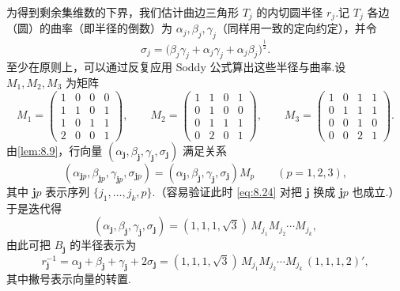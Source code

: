 为得到剩余集维数的下界，我们估计曲边三角形 $T_j$ 的内切圆半径 $r_j$.记 $T_j$ 各边（圆）的曲率（即半径的倒数）为 $\alpha_j,\beta_j,\gamma_j$（同样用一致的定向约定），并令
\begin{equation}\label{eq:8.24}
  \sigma_j=\bigl(\beta_j\gamma_j+\alpha_j\gamma_j+\alpha_j\beta_j\bigr)^{\frac{1}{2}}.
\end{equation}
至少在原则上，可以通过反复应用 Soddy 公式算出这些半径与曲率.设 $M_1,M_2,M_3$ 为矩阵
\[
  M_1=\begin{pmatrix}1&0&0&0\\1&1&0&1\\1&0&1&1\\2&0&0&1\end{pmatrix},\qquad
  M_2=\begin{pmatrix}1&1&0&1\\0&1&0&0\\0&1&1&1\\0&2&0&1\end{pmatrix},\qquad
  M_3=\begin{pmatrix}1&0&1&1\\0&1&1&1\\0&0&1&0\\0&0&2&1\end{pmatrix}.
\]
由\cref{lem:8.9}，行向量 $(\alpha_{\mathbf{j}},\beta_{\mathbf{j}},\gamma_{\mathbf{j}},\sigma_{\mathbf{j}})$ 满足关系
\[
  (\alpha_{\mathbf{j}p},\beta_{\mathbf{j}p},\gamma_{\mathbf{j}p},\sigma_{\mathbf{j}p})=(\alpha_{\mathbf{j}},\beta_{\mathbf{j}},\gamma_{\mathbf{j}},\sigma_{\mathbf{j}})M_p\qquad(p=1,2,3),
\]
其中 $\mathbf{j}p$ 表示序列 $\{j_1,\ldots,j_k,p\}$.（容易验证此时 \eqref{eq:8.24} 对把 $\mathbf{j}$ 换成 $\mathbf{j}p$ 也成立.）于是迭代得
\begin{equation}\label{eq:8.25}
  (\alpha_{\mathbf{j}},\beta_{\mathbf{j}},\gamma_{\mathbf{j}},\sigma_{\mathbf{j}})=(1,1,1,\sqrt{3})\,M_{j_1}M_{j_2}\cdots M_{j_k},
\end{equation}
由此可把 $B_{\mathbf{j}}$ 的半径表示为
\begin{equation}\label{eq:8.26}
  r_{\mathbf{j}}^{-1}=\alpha_{\mathbf{j}}+\beta_{\mathbf{j}}+\gamma_{\mathbf{j}}+2\sigma_{\mathbf{j}}
  =(1,1,1,\sqrt{3})\,M_{j_1}M_{j_2}\cdots M_{j_k}\,(1,1,1,2)' ,
\end{equation}
其中撇号表示向量的转置.

